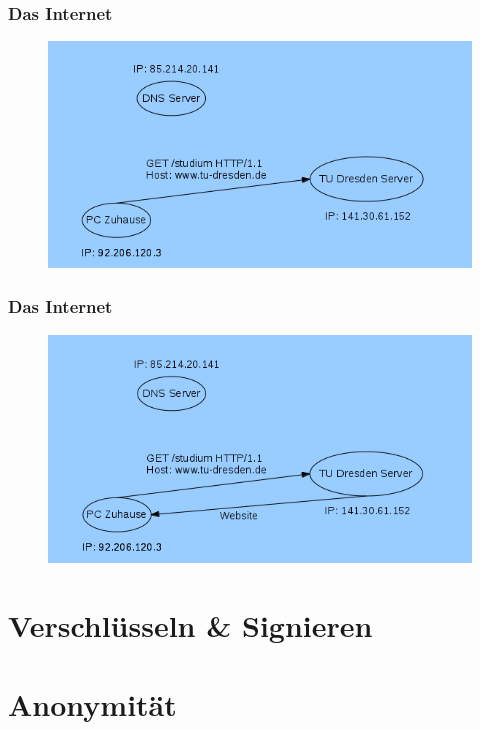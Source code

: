 \documentclass[12pt]{beamer}
\begin{document}
\begin{frame}
  \frametitle{Das Internet}
  \begin{figure}
    \includegraphics[height=0.7\textheight]{img/internetstruktur-4.png}
  \end{figure}
\end{frame}

\begin{frame}
  \frametitle{Das Internet}
  \begin{figure}
    \includegraphics[height=0.7\textheight]{img/internetstruktur-5.png}
  \end{figure}
\end{frame}

\section{Verschlüsseln \& Signieren}
\subsection{}

\section{Anonymität}
\end{document}
